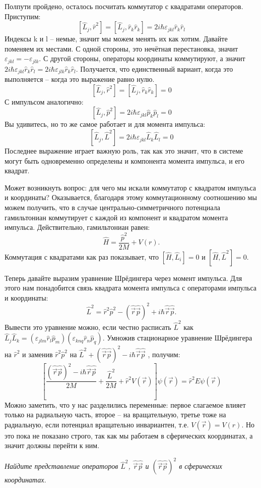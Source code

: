 Полпути пройдено, осталось посчитать коммутатор с квадратами операторов. Приступим:
\[
[\hat{L}_j, \hat{r}^2] = [\hat{L}_j, \hat{r}_k\hat{r}_k] = 2i\hbar\varepsilon_{jkl}\hat{r}_k\hat{r}_l
\]
Индексы k и l -- немые, значит мы можем менять их как хотим. Давайте поменяем их местами. С одной стороны, это нечётная перестановка, значит $\varepsilon_{jkl} = -\varepsilon_{jlk}$. С другой стороны, операторы координаты коммутируют, а значит $2i\hbar\varepsilon_{jkl}\hat{r}_k\hat{r}_l = 2i\hbar\varepsilon_{jlk}\hat{r}_k\hat{r}_l$. Получается, что единственный вариант, когда это выполняется -- когда это выражение равно нулю.
\[
[\hat{L}_j, \hat{r}^2] = [\hat{L}_j, \hat{r}_k\hat{r}_k] = 0
\]
С импульсом аналогично:
\[
[\hat{L}_j, \hat{p}^2] = 2i\hbar\varepsilon_{jkl}\hat{p}_k\hat{p}_l = 0
\]
Вы удивитесь, но то же самое работает и для момента импульса:
\[
[\hat{L}_j, \hat{L}^2] = 2i\hbar\varepsilon_{jkl}\hat{L}_k\hat{L}_l = 0
\]
Последнее выражение играет важную роль, так как это значит, что в системе могут быть одновременно определены и компонента момента импульса, и его квадрат.

Может возникнуть вопрос: для чего мы искали коммутатор с квадратом импульса и координаты? Оказывается, благодаря этому коммутационному соотношению мы можем получить, что в случае центрально-симметричного потенциала гамильтониан коммутирует с каждой из компонент и квадратом момента импульса. Действительно, гамильтониан равен: 
\[
\hat{H} = \frac{\hat{p}^2}{2M} + V(r).
\]
Коммутация с квадратами как раз показывает, что $[\hat{H}, \hat{L}_i] = 0$ и $[\hat{H}, \hat{L}^2] = 0$. 

Теперь давайте выразим уравнение Шрёдингера через момент импульса. Для этого нам понадобится связь квадрата момента импульса с операторами импульса и координаты:
\[
\hat{L}^2 = \hat{r}^2\hat{p}^2 - (\hat{\Vec{r}}\hat{\Vec{p}})^2 + i\hbar\hat{\Vec{r}}\hat{\Vec{p}}.
\]
Вывести это уравнение можно, если честно расписать $\hat{L}^2$ как $\hat{L}_j\hat{L}_k = (\varepsilon_{jlm}\hat{r}_l\hat{p}_m)(\varepsilon_{knq}\hat{r}_n\hat{p}_q)$. Умножив стационарное уравнение Шрёдингера на $\hat{r}^2$ и заменив $\hat{r}^2\hat{p}^2$ на $\hat{L}^2 + (\hat{\Vec{r}}\hat{\Vec{p}})^2 - i\hbar\hat{\Vec{r}}\hat{\Vec{p}}$ , получим:
\[
\left[\frac{(\hat{\Vec{r}}\hat{\Vec{p}})^2 - i\hbar\hat{\Vec{r}}\hat{\Vec{p}}}{2M} + \frac{\hat{L}^2}{2M} + \hat{r}^2 V(\Vec{r})\right]\psi(\Vec{r}) = \hat{r}^2 E\psi(\Vec{r})
\]
Можно заметить, что у нас разделились переменные: первое слагаемое влияет только на радиальную часть, второе -- на вращательную, третье тоже на радиальную, если потенциал вращательно инвариантен, т.е. $V(\Vec{r}) = V(r)$. Но это пока не показано строго, так как мы работаем в сферических координатах, а значит должны перейти к ним.
\begin{center}
    \textit{Найдите представление операторов $\hat{L}^2$, $\hat{\Vec{r}}\hat{\Vec{p}}$ и $(\hat{\Vec{r}}\hat{\Vec{p}})^2$ в сферических координатах.}
\end{center}

